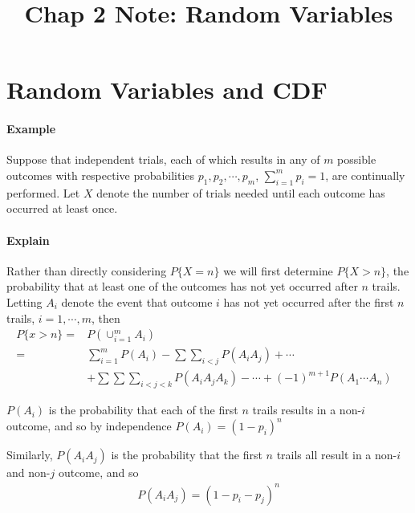 \documentclass[10 pt,final]{article}
\title{Chap 2 Note: Random Variables}
\newcommand{\impo}[1]{{\color{magenta} #1}}
\begin{document}
\date{}

\maketitle


\section{Random Variables and CDF}
\paragraph{Example} Suppose that independent trials, each of which results in any of $m$ possible outcomes with respective probabilities $p_1, p_2, \cdots, p_m$, $\sum^m_{i=1} p_i = 1$, are continually performed. Let $X$ denote the number of trials needed until each outcome has occurred at least once.

\paragraph{Explain} Rather than directly considering $P\{X = n\}$ we will first determine $P\{X > n\}$, the probability that at least one of the outcomes has not yet occurred after $n$ trails. Letting $A_i$ denote the event that outcome $i$ has not yet occurred after the first $n$ trails, $i=1,\cdots, m$, then 
\begin{align*}
P\{x > n\} = & P(\cup^m_{i=1} A_i) & \\
= & \sum^m_{i=1} P(A_i) - \sum \sum_{i<j} P(A_i A_j) + \cdots & \\
& + \sum \sum \sum_{i<j<k} P(A_i A_j A_k) - \cdots + (-1)^{m+1} P(A_1 \cdots A_n) & 
\end{align*} 

\impo{$P(A_i)$ is the probability that each of the first $n$ trails results in a non-$i$ outcome, and so by independence $P(A_i) = (1-p_i)^n$}

Similarly, $P(A_i A_j)$ is the probability that the first $n$ trails all result in a non-$i$ and non-$j$ outcome, and so
\begin{align*}
P(A_i A_j) = (1-p_i - p_j)^n
\end{align*}
\end{document}
